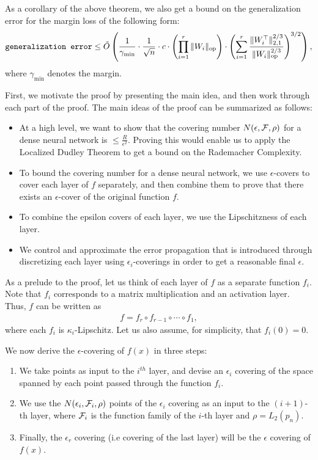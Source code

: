 \begin{remark}
    As a corollary of the above theorem, we also get a bound on the generalization error for the margin loss of the following form:
    \begin{equation}
        \texttt{generalization error} \leq \tilde{O}\left(\frac{1}{\gamma_{\min}} \cdot \frac{1}{\sqrt{n}}\cdot c \cdot \left(\prod_{i=1}^r\|W_i\|_{\textup{op}} \right) \cdot {\left( \sum_{i=1}^r\frac{\|W_i^\top\|^{2/3}_{2,1}}{\|W_i\|_{\textup{op}}^{2/3}}\right)^{3/2}}  \right),
    \end{equation}
    where $\gamma_{\min}$ denotes the margin.
\end{remark}
	
First, we motivate the proof by presenting the main idea, and then work through each part of the proof. The main ideas of the proof can be summarized as follows:
    
\begin{itemize}
    \item At a high level, we want to show that the covering number $N(\epsilon, \mathcal F, \rho)$ for a dense neural network is $\leq \frac{R}{\epsilon^2}$. Proving this would enable us to apply the Localized Dudley Theorem to get a bound on the Rademacher Complexity.
    \item To bound the covering number for a dense neural network, we use $\epsilon$-covers to cover each layer of $f$ separately, and then combine them to prove that there exists an $\epsilon$-cover of the original function $f$. 
    \item To combine the epsilon covers of each layer, we use the Lipschitzness of each layer.
    \item We control and approximate the error propagation that is introduced through discretizing each layer using $\epsilon_i$-coverings in order to get a reasonable final $\epsilon$.
\end{itemize}

As a prelude to the proof, let us think of each layer of $f$ as a separate function $f_i$. Note that $f_i$ corresponds to a matrix multiplication and an activation layer. Thus, $f$ can be written as 
\begin{align}
    f = f_r \circ f_{r-1} \circ \cdots \circ f_1,
\end{align}
where each $f_i$ is $\kappa_i$-Lipschitz. Let us also assume, for simplicity, that $f_i(0) = 0$. 

We now derive the $\epsilon$-covering of $f(x)$ in three steps:
\begin{enumerate}
    \item We take points as input to the $i^{th}$ layer, and devise an $\epsilon_i$ covering of the space spanned by each point passed through the function $f_i$.
    \item We use the $N(\epsilon_i, \mathcal F_i, \rho)$ points of the $\epsilon_i$ covering as an input to the $(i+1)$-th layer, where $\mathcal F_i$ is the function family of the $i$-th layer and $\rho = L_2(p_n)$.
    \item Finally, the $\epsilon_r$ covering (i.e covering of the last layer) will be the $\epsilon$ covering of $f(x)$.
\end{enumerate}

